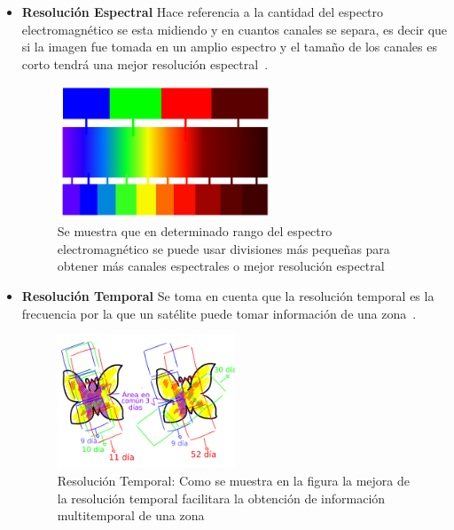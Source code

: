 \begin{itemize}
\item \textbf{Resolución Espectral}\newline
 Hace referencia a la cantidad del espectro electromagnético se esta midiendo y en cuantos canales se separa, es decir que si la imagen fue tomada en un amplio espectro y el tamaño de los canales es corto tendrá una mejor resolución espectral~\cite{wulder2012remote}.
 \begin{figure}[H]
     \centering
     \includegraphics[width=0.6\textwidth]{images/02theory/resolucionespectralCortada.png}
     \caption[Resolución espectral]{Se muestra que en determinado rango del espectro electromagnético se puede usar divisiones más pequeñas para obtener más canales espectrales o mejor resolución espectral}
     \label{fig:resolucionEspectral}
 \end{figure}
 
 
\item \textbf{Resolución Temporal}\newline
 Se toma en cuenta que la resolución temporal es la frecuencia por la que un satélite puede tomar información de una zona~\cite{Wulder1998}.
\begin{figure}[H]
    \centering
    \includegraphics[width=0.5\textwidth]{images/02theory/resolucionTemporalEspa.png}
    \caption[Resolución Radiométrica]{Resolución Temporal: Como se muestra en la figura la mejora de la resolución temporal facilitara la obtención de información multitemporal de una zona}
    \label{fig:my_label}
\end{figure} 
 

\end{itemize}
